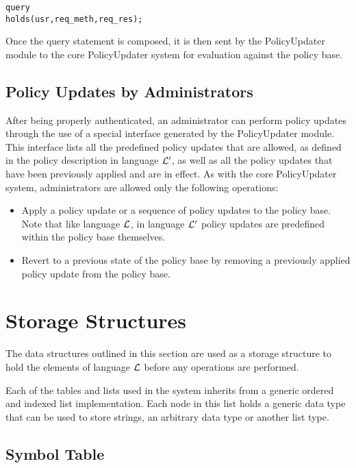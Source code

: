 \documentclass[11pt, twocolumn]{article}
\makeatletter
\newenvironment{vverbatim}
  {\begin{alltt}}
  {\vspace{-\baselineskip}\end{alltt}}
\newcommand{\vappsection}[1]{
  \renewcommand{\@seccntformat}[1]{
    \appendixname\hspace{0.5em}\csname the##1\endcsname \hspace{1em}
  }
  \section{#1}
  \renewcommand{\@seccntformat}[1]{
    \csname the##1\endcsname\hspace{1em}
  }
}
\makeatother
\begin{document}
      \begin{vverbatim}
  query
    holds(usr, req\_meth, req\_res);
      \end{vverbatim}

      Once the query statement is composed, it is then sent by the
      PolicyUpdater module to the core PolicyUpdater system for evaluation
      against the policy base.

    \subsection{Policy Updates by Administrators}

      After being properly authenticated, an administrator can perform policy
      updates through the use of a special interface generated by the
      PolicyUpdater module. This interface lists all the predefined policy
      updates that are allowed, as defined in the policy description in
      language ${\cal L'}$, as well as all the policy updates that have been
      previously applied and are in effect. As with the core PolicyUpdater
      system, administrators are allowed only the following operations:

      \begin{itemize}
        \item
          Apply a policy update or a sequence of policy updates to the policy
          base. Note that like language ${\cal L}$, in language ${\cal L'}$
          policy updates are predefined within the policy base themselves.
        \item
          Revert to a previous state of the policy base by removing a
          previously applied policy update from the policy base.
      \end{itemize}

  \vappsection{Storage Structures}

    \label{app-store}

    The data structures outlined in this section are used as a storage
    structure to hold the elements of language ${\cal L}$ before any
    operations are performed.

    Each of the tables and lists used in the system inherits from a generic
    ordered and indexed list implementation. Each node in this list holds a
    generic data type that can be used to store strings, an arbitrary data
    type or another list type.

    \subsection{Symbol Table}
\end{document}
